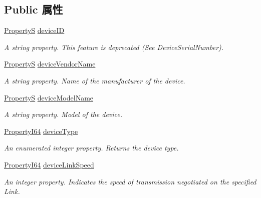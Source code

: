 \subsection*{Public 属性}
\begin{DoxyCompactItemize}
\item 
\hyperlink{classmv_i_m_p_a_c_t_1_1acquire_1_1_property_s}{Property\+S} \hyperlink{classmv_i_m_p_a_c_t_1_1acquire_1_1_gen_i_cam_1_1_device_module_a656ceaaf54b8598e6bc71484c4d5734b}{device\+I\+D}
\begin{DoxyCompactList}\small\item\em A string property. This feature is deprecated (See Device\+Serial\+Number). \end{DoxyCompactList}\item 
\hyperlink{classmv_i_m_p_a_c_t_1_1acquire_1_1_property_s}{Property\+S} \hyperlink{classmv_i_m_p_a_c_t_1_1acquire_1_1_gen_i_cam_1_1_device_module_ac4eb3b74a5fec7c810024da6d0a78d4c}{device\+Vendor\+Name}
\begin{DoxyCompactList}\small\item\em A string property. Name of the manufacturer of the device. \end{DoxyCompactList}\item 
\hyperlink{classmv_i_m_p_a_c_t_1_1acquire_1_1_property_s}{Property\+S} \hyperlink{classmv_i_m_p_a_c_t_1_1acquire_1_1_gen_i_cam_1_1_device_module_a69198a07064e23d20df49a09471d5634}{device\+Model\+Name}
\begin{DoxyCompactList}\small\item\em A string property. Model of the device. \end{DoxyCompactList}\item 
\hyperlink{group___common_interface_ga81749b2696755513663492664a18a893}{Property\+I64} \hyperlink{classmv_i_m_p_a_c_t_1_1acquire_1_1_gen_i_cam_1_1_device_module_a6b240ba418a9d63a872da61b7b718fb5}{device\+Type}
\begin{DoxyCompactList}\small\item\em An enumerated integer property. Returns the device type. \end{DoxyCompactList}\item 
\hyperlink{group___common_interface_ga81749b2696755513663492664a18a893}{Property\+I64} \hyperlink{classmv_i_m_p_a_c_t_1_1acquire_1_1_gen_i_cam_1_1_device_module_ae36bd32918b145962a52156da629adc8}{device\+Link\+Speed}
\begin{DoxyCompactList}\small\item\em An integer property. Indicates the speed of transmission negotiated on the specified Link. \end{DoxyCompactList}\item 

\end{DoxyCompactItemize}
